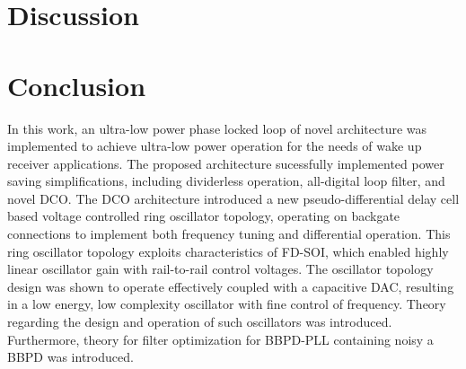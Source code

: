	\FloatBarrier\pagebreak

	\section{Discussion}\label{disco}
    

    \FloatBarrier

    \pagebreak
    \section{Conclusion} \label{conclusion}

    In this work, an ultra-low power phase locked loop of novel architecture was implemented to achieve ultra-low power operation for the needs of wake up receiver applications. The proposed architecture sucessfully implemented power saving simplifications, including dividerless operation, all-digital loop filter, and novel DCO. The DCO architecture introduced a new pseudo-differential delay cell based voltage controlled ring oscillator topology, operating on backgate connections to implement both frequency tuning and differential operation. This ring oscillator topology exploits characteristics of FD-SOI, which enabled highly linear oscillator gain with rail-to-rail control voltages. The oscillator topology design was shown to operate effectively coupled with a capacitive DAC, resulting in a low energy, low complexity oscillator with fine control of frequency. Theory regarding the design and operation of such oscillators was introduced. Furthermore, theory for filter optimization for BBPD-PLL containing noisy a BBPD was introduced.


    \pagebreak
	\printbibliography


	\pagebreak
	



